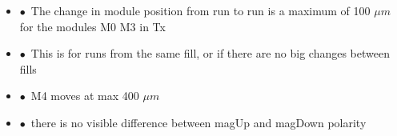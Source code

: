 \documentclass[aspectratio=1610, 12pt]{beamer}
\begin{document}
\begin{frame}%
  \begin{columns}
    \begin{column}[c]{0.9\textwidth}
      \begin{itemize}
        \item $\bullet$\, The change in module position from run to run is a maximum of 100 $\mu m$ for the modules M0 \to M3 in Tx
        \item $\bullet$\, This is for runs from the same fill, or if there are no big changes between fills
        \item $\bullet$\, M4 moves at max 400 $\mu m$
        \item $\bullet$\, there is no visible difference between magUp and magDown polarity
      \end{itemize}
    \end{column}
  \end{columns}
\end{frame}
\end{document}

